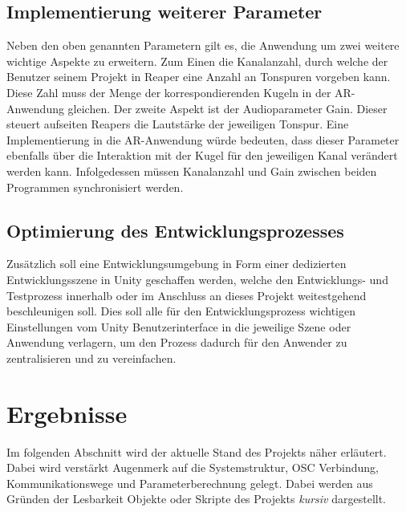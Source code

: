 \documentclass[11pt, titlepage, fleqn]{report}
\begin{document}
            \subsection*{Implementierung weiterer Parameter}
                Neben den oben genannten Parametern gilt es, die Anwendung um 
                zwei weitere wichtige Aspekte zu erweitern. Zum 
                Einen die Kanalanzahl, durch welche der Benutzer 
                seinem Projekt in Reaper eine Anzahl an Tonspuren vorgeben 
                kann. Diese Zahl muss der Menge der korrespondierenden Kugeln 
                in der AR-Anwendung gleichen.
                Der zweite Aspekt ist der Audioparameter Gain. Dieser steuert 
                aufseiten Reapers die Lautstärke der jeweiligen 
                Tonspur. Eine Implementierung in die AR-Anwendung würde 
                bedeuten, dass dieser Parameter ebenfalls über die Interaktion 
                mit der Kugel für den jeweiligen Kanal verändert werden kann. 
                Infolgedessen müssen Kanalanzahl und Gain zwischen beiden 
                Programmen synchronisiert werden.
            \subsection*{Optimierung des Entwicklungsprozesses}
                Zusätzlich soll eine Entwicklungsumgebung in Form einer dedizierten Entwicklungsszene in Unity geschaffen werden, 
                welche den Entwicklungs- und Testprozess innerhalb oder im Anschluss an dieses Projekt weitestgehend beschleunigen 
                soll. Dies soll alle für den Entwicklungsprozess wichtigen Einstellungen vom Unity Benutzerinterface in die 
                jeweilige Szene oder Anwendung verlagern, um den Prozess dadurch für den Anwender zu zentralisieren und zu 
                vereinfachen.
        \newpage
        \section{Ergebnisse}
            Im folgenden Abschnitt wird der aktuelle Stand des Projekts näher 
            erläutert. Dabei wird verstärkt Augenmerk auf die 
            Systemstruktur, OSC Verbindung, Kommunikationswege und 
            Parameterberechnung gelegt. Dabei werden aus Gründen der Lesbarkeit 
            Objekte oder Skripte des Projekts \textit{kursiv} dargestellt.
        \label{sec:3.2}
\end{document}
